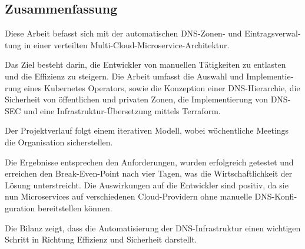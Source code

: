 \begin{otherlanguage}{ngerman}
	\chapter*{Zusammenfassung}
	Diese Arbeit befasst sich mit der automatischen DNS-Zonen- und Eintragsverwaltung in einer verteilten Multi-Cloud-Microservice-Architektur.
	\medskip

	\noindent
	Das Ziel besteht darin, die Entwickler von manuellen Tätigkeiten zu entlasten und die Effizienz zu steigern.
	Die Arbeit umfasst die Auswahl und Implementierung eines Kubernetes Operators, sowie die Konzeption einer DNS-Hierarchie,
	die Sicherheit von öffentlichen und privaten Zonen, die Implementierung von DNSSEC und eine Infrastruktur-Übersetzung mittels Terraform.
	\medskip

	\noindent
	Der Projektverlauf folgt einem iterativen Modell, wobei wöchentliche Meetings die Organisation sicherstellen.
	\medskip

	\noindent
	Die Ergebnisse entsprechen den Anforderungen, wurden erfolgreich getestet und erreichen den Break-Even-Point nach vier Tagen, was die Wirtschaftlichkeit der Lösung unterstreicht.
	Die Auswirkungen auf die Entwickler sind positiv, da sie nun Microservices auf verschiedenen Cloud-Providern ohne manuelle DNS-Konfiguration bereitstellen können.
	\medskip

	\noindent
	Die Bilanz zeigt, dass die Automatisierung der DNS-Infrastruktur einen wichtigen Schritt in Richtung Effizienz und Sicherheit darstellt.
\end{otherlanguage}
